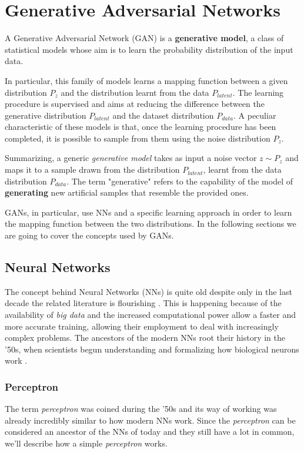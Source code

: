 \section{Generative Adversarial Networks}

A Generative Adversarial Network (GAN) is a \textbf{generative model}, a class of statistical models whose aim is to learn the probability distribution of the input data.

In particular, this family of models learns a mapping function between a given distribution $P_z$ and the distribution learnt from the data $P_{latent}$.
The learning procedure is supervised and aims at reducing the difference between the generative distribution $P_{latent}$ and the dataset distribution $P_{data}$.
A peculiar characteristic of these models is that, once the learning procedure has been completed, it is possible to sample from them using the noise distribution $P_z$.

Summarizing, a generic \textit{generative model} takes as input a noise vector $z \sim P_z$ and maps it to a sample drawn from the distribution $P_{latent}$, learnt from the data distribution $P_{data}$.
The term "generative" refers to the capability of the model of \textbf{generating} new artificial samples that resemble the provided ones.

GANs, in particular, use NNs and a specific learning approach in order to learn the mapping function between the two distributions.
In the following sections we are going to cover the concepts used by GANs.

\subsection{Neural Networks}
The concept behind Neural Networks (NNs) is quite old despite only in the last decade the related literature is flourishing \cite{nn_survey}.
This is happening because of the availability of \textit{big data} and the increased computational power allow a faster and more accurate training, allowing their employment to deal with increasingly complex problems.
The ancestors of the modern NNs root their history in the '50s, when scientists begun understanding and formalizing how biological neurons work \cite{Rosenblatt58theperceptron}.

\subsubsection{Perceptron}
The term \textit{perceptron} was coined during the '50s and its way of working was already incredibly similar to how modern NNs work.
Since the \textit{perceptron} can be considered an ancestor of the NNs of today and they still have a lot in common, we'll describe how a simple \textit{perceptron} works.

